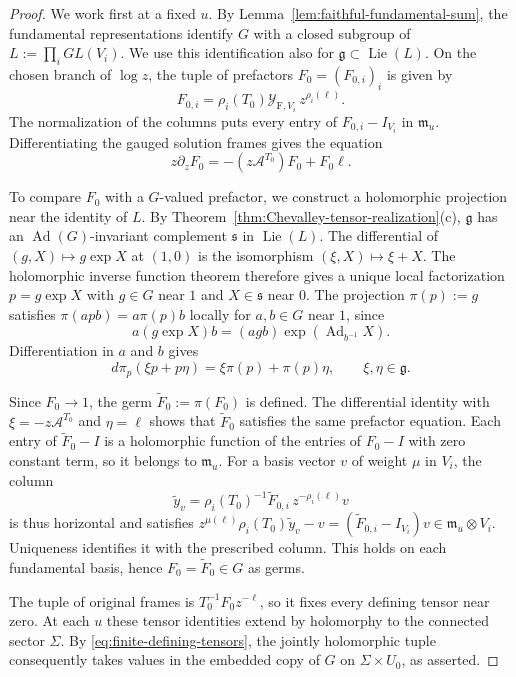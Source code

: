 \documentclass[11pt,leqno]{amsart}
\numberwithin{equation}{section}
\theoremstyle{plain}
\theoremstyle{definition}
\theoremstyle{plain}
\theoremstyle{definition}
\theoremstyle{remark}
\newcommand{\g}{\mathfrak g}
\begin{document}
\begin{proof}
We work first at a fixed $u$.  By Lemma~\ref{lem:faithful-fundamental-sum}, the fundamental representations identify $G$ with a closed subgroup of $L:=\prod_i GL(V_i)$.  We use this identification also for $\g\subset\operatorname{Lie}(L)$.  On the chosen branch of $\log z$, the tuple of prefactors $F_0=(F_{0,i})_i$ is given by
\[
 F_{0,i}=\rho_i(T_0)\mathcal Y_{\mathrm F,V_i}\,z^{\rho_i(\ell)}.
\]
The normalization of the columns puts every entry of $F_{0,i}-I_{V_i}$ in $\mathfrak m_u$.  Differentiating the gauged solution frames gives the equation
\[
 z\partial_z F_0=-(z\mathscr A^{T_0})F_0+F_0\ell .
\]

To compare $F_0$ with a $G$-valued prefactor, we construct a holomorphic projection near the identity of $L$.  By Theorem~\ref{thm:Chevalley-tensor-realization}(c), $\g$ has an $\operatorname{Ad}(G)$-invariant complement $\mathfrak s$ in $\operatorname{Lie}(L)$.  The differential of $(g,X)\mapsto g\exp X$ at $(1,0)$ is the isomorphism $(\xi,X)\mapsto\xi+X$.  The holomorphic inverse function theorem therefore gives a unique local factorization $p=g\exp X$ with $g\in G$ near $1$ and $X\in\mathfrak s$ near $0$.  The projection $\pi(p):=g$ satisfies $\pi(apb)=a\pi(p)b$ locally for $a,b\in G$ near $1$, since
\[
 a(g\exp X)b=(agb)\exp(\operatorname{Ad}_{b^{-1}}X).
\]
Differentiation in $a$ and $b$ gives
\[
 d\pi_p(\xi p+p\eta)=\xi\pi(p)+\pi(p)\eta,
 \qquad \xi,\eta\in\g .
\]

Since $F_0\to1$, the germ $\widetilde F_0:=\pi(F_0)$ is defined.  The differential identity with $\xi=-z\mathscr A^{T_0}$ and $\eta=\ell$ shows that $\widetilde F_0$ satisfies the same prefactor equation.  Each entry of $\widetilde F_0-I$ is a holomorphic function of the entries of $F_0-I$ with zero constant term, so it belongs to $\mathfrak m_u$.  For a basis vector $v$ of weight $\mu$ in $V_i$, the column
\[
 \widetilde y_v=\rho_i(T_0)^{-1}\widetilde F_{0,i}\,z^{-\rho_i(\ell)}v
\]
is thus horizontal and satisfies $z^{\mu(\ell)}\rho_i(T_0)\widetilde y_v-v=(\widetilde F_{0,i}-I_{V_i})v\in\mathfrak m_u\otimes V_i$.  Uniqueness identifies it with the prescribed column.  This holds on each fundamental basis, hence $F_0=\widetilde F_0\in G$ as germs.

The tuple of original frames is $T_0^{-1}F_0z^{-\ell}$, so it fixes every defining tensor near zero.  At each $u$ these tensor identities extend by holomorphy to the connected sector $\Sigma$.  By \eqref{eq:finite-defining-tensors}, the jointly holomorphic tuple consequently takes values in the embedded copy of $G$ on $\Sigma\times U_0$, as asserted.
\end{proof}
\end{document}
